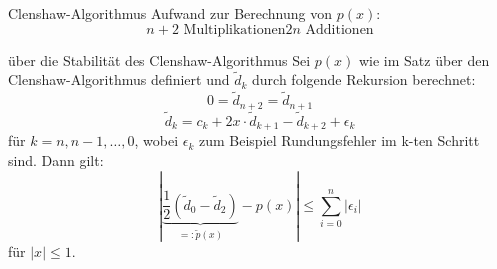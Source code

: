 \begin{flashcard}[Aufwand]{Clenshaw-Algorithmus}
Aufwand zur Berechnung von $p(x)$:
$$
	n+2 \text{ Multiplikationen}
	2n \text{ Additionen}
$$
\end{flashcard}

\begin{flashcard}[Satz]{über die Stabilität des Clenshaw-Algorithmus}
Sei $p(x)$ wie im Satz über den Clenshaw-Algorithmus definiert und $\tilde{d}_k$ durch folgende Rekursion berechnet:
$$
	0 = \tilde{d}_{n+2} = \tilde{d}_{n+1}
$$
$$
	\tilde{d}_k = c_k + 2x \cdot \tilde{d}_{k+1} - \tilde{d}_{k+2} + \epsilon_k
$$
für $k = n,n-1, \ldots , 0$, wobei $\epsilon_k$ zum Beispiel Rundungsfehler im k-ten Schritt sind. Dann gilt:
$$
	| \underbrace{\frac{1}{2}(\tilde{d}_0 - \tilde{d}_2)}_{=:\tilde{p}(x)} - p(x) | \leq \sum_{i=0}^n |\epsilon_i|
$$
für $|x| \leq 1$.
\end{flashcard}
